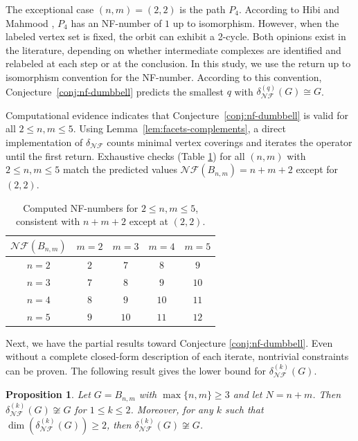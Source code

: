 \documentclass[12pt]{article}
\theoremstyle{plain}
\newtheorem{proposition}[theorem]{Proposition}
\theoremstyle{definition}
\begin{document}
	 The exceptional case $(n,m)=(2,2)$ is the path $P_4$.  According to Hibi and Mahmood \cite{HibiMahmood2020}, $P_4$ has an NF-number of $1$ up to isomorphism. However, when the labeled vertex set is fixed, the orbit can exhibit a 2-cycle. Both opinions exist in the literature, depending on whether intermediate complexes are identified and relabeled at each step or at the conclusion.		In this study, we use the return up to isomorphism convention for the NF-number. According to this convention, Conjecture~\ref{conj:nf-dumbbell} predicts the smallest $q$ with $\delta_{\mathcal{NF}}^{(q)}(G)\cong G$.
	
	\medskip
	Computational evidence indicates that Conjecture~\ref{conj:nf-dumbbell} is valid for all $2\le n,m\le 5$. Using Lemma~\ref{lem:facets-complements}, a direct implementation of $\delta_{\mathcal{NF}}$ counts minimal vertex coverings and iterates the operator until the first return.		Exhaustive checks (Table \ref{tab 1}) for all $(n,m)$ with $2\le n,m\le 5$ match the predicted values
		$\mathcal{NF}(B_{n,m})=n+m+2$ except for $(2,2)$.
	 \begin{table}[h]
		\centering
		\begin{tabular}{c||cccc}
			$\mathcal{NF}(B_{n,m})$ & $m=2$ & $m=3$ & $m=4$ & $m=5$\\ \hline\hline
			$n=2$ & $2$ & $7$ & $8$ & $9$\\
			$n=3$ & $7$ & $8$ & $9$ & $10$\\
			$n=4$ & $8$ & $9$ & $10$ & $11$\\
			$n=5$ & $9$ & $10$ & $11$ & $12$\\ \hline\hline
		\end{tabular}
		\caption{Computed NF-numbers for $2\le n,m\le 5$, consistent with $n+m+2$ except at $(2,2)$.}
		\label{tab 1}
	\end{table}
	
	Next, we have the partial results toward Conjecture \ref{conj:nf-dumbbell}.  Even without a complete closed-form description of each iterate, nontrivial constraints can be proven.
	The following result gives the lower bound for $\delta_{\mathcal{NF}}^{(k)}(G).$
	\begin{proposition}\label{prop:lower-bound}
		Let $G=B_{n,m}$ with $\max\{n,m\}\ge 3$ and let $N=n+m$.
		Then $\delta_{\mathcal{NF}}^{(k)}(G)\not\cong G$ for $1\le k\le 2$.
		Moreover, for any $k$ such that $\dim(\delta_{\mathcal{NF}}^{(k)}(G))\ge 2$, then  $\delta_{\mathcal{NF}}^{(k)}(G)\not\cong G$.
	\end{proposition}
	
\end{document}
